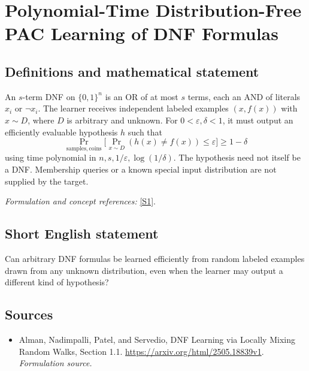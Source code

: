\documentclass[11pt]{article}
\begin{document}
\section*{\texorpdfstring{Polynomial-Time Distribution-Free PAC Learning of DNF Formulas}{Polynomial-Time Distribution-Free PAC Learning of DNF Formulas}}\label{statement}
\subsection{Definitions and mathematical statement}
An $s$-term DNF on $\{0,1\}^n$ is an OR of at most $s$ terms, each an AND of literals $x_i$ or $\neg x_i$. The learner receives independent labeled examples $(x,f(x))$ with $x\sim D$, where $D$ is arbitrary and unknown. For $0<{\varepsilon},\delta<1$, it must output an efficiently evaluable hypothesis $h$ such that
\[
 \Pr_{\mathrm{samples,coins}}\bigl[\Pr_{x\sim D}(h(x)\ne f(x))\le{\varepsilon}\bigr]\ge1-\delta
\]
using time polynomial in $n,s,1/{\varepsilon},\log(1/\delta)$. The hypothesis need not itself be a DNF. Membership queries or a known special input distribution are not supplied by the target.
\par\smallskip\textit{Formulation and concept references:} \href{https://arxiv.org/html/2505.18839v1}{[S1]}.

\subsection{Short English statement}
Can arbitrary DNF formulas be learned efficiently from random labeled examples drawn from any unknown distribution, even when the learner may output a different kind of hypothesis?
\subsection{Sources}
\begin{itemize}
\item[S1]Alman, Nadimpalli, Patel, and Servedio, DNF Learning via Locally Mixing Random Walks, Section 1.1.
\url{https://arxiv.org/html/2505.18839v1}.
\textit{Formulation source.}
\end{itemize}
\end{document}
